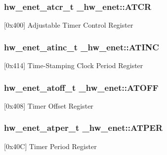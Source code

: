 \subsubsection[{\texorpdfstring{A\+T\+CR}{ATCR}}]{ {\bf hw\+\_\+enet\+\_\+atcr\+\_\+t} \+\_\+hw\+\_\+enet\+::\+A\+T\+CR}\hypertarget{struct__hw__enet_a6ab6ebaf676fe0961eaaec83137dc0d1}{}\label{struct__hw__enet_a6ab6ebaf676fe0961eaaec83137dc0d1}
\mbox{[}0x400\mbox{]} Adjustable Timer Control Register 
\subsubsection[{\texorpdfstring{A\+T\+I\+NC}{ATINC}}]{ {\bf hw\+\_\+enet\+\_\+atinc\+\_\+t} \+\_\+hw\+\_\+enet\+::\+A\+T\+I\+NC}\hypertarget{struct__hw__enet_a7adf7be2b152e7bb88b2dda8b86e1775}{}\label{struct__hw__enet_a7adf7be2b152e7bb88b2dda8b86e1775}
\mbox{[}0x414\mbox{]} Time-\/\+Stamping Clock Period Register 
\subsubsection[{\texorpdfstring{A\+T\+O\+FF}{ATOFF}}]{ {\bf hw\+\_\+enet\+\_\+atoff\+\_\+t} \+\_\+hw\+\_\+enet\+::\+A\+T\+O\+FF}\hypertarget{struct__hw__enet_a66842e8dda10c1b02032752be76b453c}{}\label{struct__hw__enet_a66842e8dda10c1b02032752be76b453c}
\mbox{[}0x408\mbox{]} Timer Offset Register 
\subsubsection[{\texorpdfstring{A\+T\+P\+ER}{ATPER}}]{ {\bf hw\+\_\+enet\+\_\+atper\+\_\+t} \+\_\+hw\+\_\+enet\+::\+A\+T\+P\+ER}\hypertarget{struct__hw__enet_a4cce0ebd91362e65a4e621c95d0f3eb2}{}\label{struct__hw__enet_a4cce0ebd91362e65a4e621c95d0f3eb2}
\mbox{[}0x40C\mbox{]} Timer Period Register 
